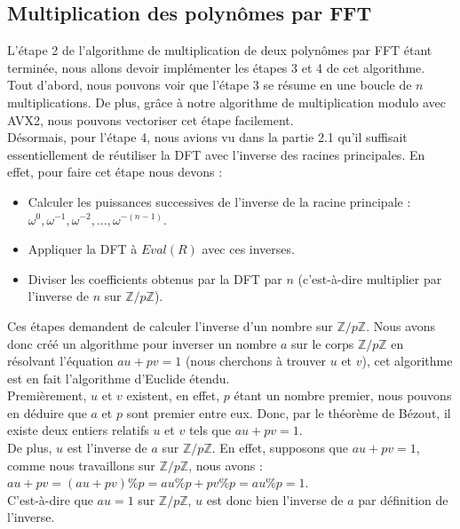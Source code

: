 \documentclass[12pt, a4paper]{article}
\begin{document}
\subsection{Multiplication des polynômes par FFT}
L'étape 2 de l'algorithme de multiplication de deux polynômes par FFT étant terminée, nous allons devoir implémenter les étapes 3 et 4 de cet algorithme. \\
\indent Tout d'abord, nous pouvons voir que l'étape 3 se résume en une boucle de $n$ multiplications. De plus, grâce à notre algorithme de multiplication modulo avec AVX2, nous pouvons vectoriser cet étape facilement. \\
\indent Désormais, pour l'étape 4, nous avions vu dans la partie 2.1 qu'il suffisait essentiellement de réutiliser la DFT avec l'inverse des racines principales. En effet, pour faire cet étape nous devons :
{\begin{itemize}
  \item Calculer les puissances successives de l'inverse de la racine principale : \\
   $\omega^{0},\omega^{-1},\omega^{-2},\dots,\omega^{-(n-1)}$.
  \item Appliquer la DFT à $Eval(R)$ avec ces inverses.
  \item Diviser les coefficients obtenus par la DFT par $n$ (c'est-à-dire multiplier par l'inverse de $n$ sur $\mathbb{Z}/p\mathbb{Z}$).
\end{itemize}}
\indent Ces étapes demandent de calculer l'inverse d'un nombre sur $\mathbb{Z}/p\mathbb{Z}$. Nous avons donc créé un algorithme pour inverser un nombre $a$ sur le corps $\mathbb{Z}/p\mathbb{Z}$ en résolvant l'équation $au + pv = 1$ (nous cherchons à trouver $u$ et $v$), cet algorithme est en fait l'algorithme d'Euclide étendu.
\\
Premièrement, $u$ et $v$ existent, en effet, $p$ étant un nombre premier, nous pouvons en déduire que $a$ et $p$ sont premier entre eux. Donc, par le théorème de Bézout, il existe deux entiers relatifs $u$ et $v$ tels que $au + pv = 1$. \\
De plus, $u$ est l'inverse de $a$ sur $\mathbb{Z}/p\mathbb{Z}$. En effet, supposons que $au + pv = 1$, comme nous travaillons sur $\mathbb{Z}/p\mathbb{Z}$, nous avons : \\
$au+pv = (au+pv)\%p = au\%p + pv\%p = au\%p = 1$. \\ 
C'est-à-dire que $au = 1$ sur $\mathbb{Z}/p\mathbb{Z}$, $u$ est donc bien l'inverse de $a$ par définition de l'inverse. \\
\end{document}

